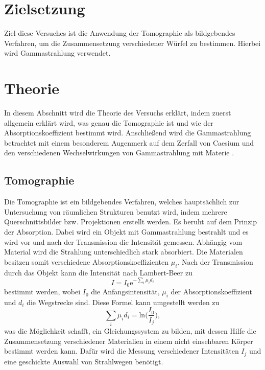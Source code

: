 \section{Zielsetzung}
\label{sec:Zielsetzung}
Ziel diese Versuches ist die Anwendung der Tomographie als bildgebendes Verfahren, um die Zusammensetzung verschiedener Würfel zu bestimmen.
Hierbei wird Gammastrahlung verwendet.

\section{Theorie}
\label{sec:Theorie}
In diesem Abschnitt wird die Theorie des Versuchs erklärt, indem zuerst allgemein erklärt wird, was genau die Tomographie ist und wie der Absorptionskoeffizient bestimmt wird.
Anschließend wird die Gammastrahlung betrachtet mit einem besonderem Augenmerk auf dem Zerfall von Caesium und den verschiedenen Wechselwirkungen von Gammastrahlung mit Materie . 

\subsection{Tomographie}
\label{subsec:Tomographie}
Die Tomographie ist ein bildgebendes Verfahren, welches hauptsächlich zur Untersuchung von räumlichen Strukturen benutzt wird,
indem mehrere Querschnittsbilder bzw. Projektionen erstellt werden.
Es beruht auf dem Prinzip der Absorption. Dabei wird ein Objekt mit Gammastrahlung bestrahlt und es wird vor und nach der Transmission die
Intensität gemessen. Abhängig vom Material wird die Strahlung unterschiedlich stark absorbiert. Die Materialen besitzen somit verschiedene
Absorptionskoeffizienten $\mu_i$.
Nach der Transmission durch das Objekt kann die Intensität nach Lambert-Beer zu
\begin{equation*}
    I = I_0 \text{e}^{-\sum_i \mu_i d_i}
\end{equation*}
bestimmt werden, wobei $I_0$ die Anfangsintensität, $\mu_i$ der Absorptionskoeffizient und $d_i$ die Wegstrecke sind.
Diese Formel kann umgestellt werden zu
\begin{equation}
    \sum_i \mu_i d_i = \text{ln}\biggl(\frac{I_0}{I_j}\biggr),
    \label{eqn:mu}
\end{equation}
was die Möglichkeit schafft, ein Gleichungssystem zu bilden, mit dessen Hilfe die Zusammensetzung verschiedener Materialien in einem nicht
einsehbaren Körper bestimmt werden kann.
Dafür wird die Messung verschiedener Intensitäten $I_j$ und eine geschickte Auswahl von Strahlwegen benötigt.

